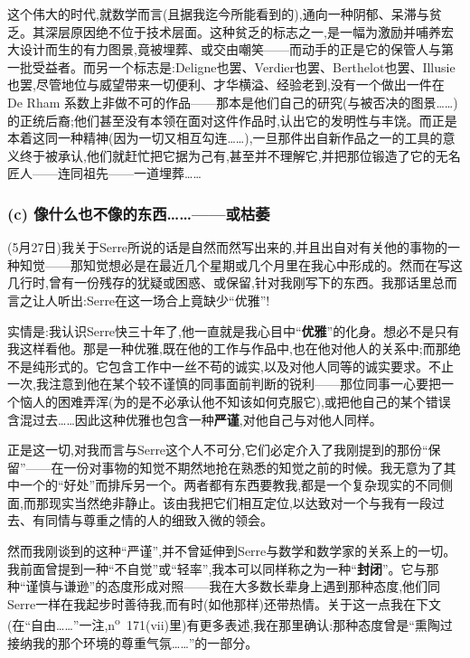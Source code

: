 这个伟大的时代,就数学而言(且据我迄今所能看到的),通向一种阴郁、呆滞与贫乏。其深层原因绝不位于技术层面。这种贫乏的标志之一,是一幅为激励并哺养宏大设计而生的有力图景,竟被埋葬、或交由嘲笑——而动手的正是它的保管人与第一批受益者。而另一个标志是:Deligne也罢、Verdier也罢、Berthelot也罢、Illusie也罢,尽管地位与威望带来一切便利、才华横溢、经验老到,没有一个做出一件在 De Rham 系数上非做不可的作品——那本是他们自己的研究(与被否决的图景……)的正统后裔;他们甚至没有本领在面对这件作品时,认出它的发明性与丰饶。而正是本着这同一种精神(因为一切又相互勾连……),一旦那件出自新作品之一的工具的意义终于被承认,他们就赶忙把它据为己有,甚至并不理解它,并把那位锻造了它的无名匠人——连同祖先——一道埋葬……
\subsubsection*{(c) 像什么也不像的东西……——或枯萎}



(5月27日)我关于Serre所说的话是自然而然写出来的,并且出自对有关他的事物的一种知觉——那知觉想必是在最近几个星期或几个月里在我心中形成的。\dmark{}然而在写这几行时,曾有一份残存的犹疑或困惑、或保留,针对我刚写下的东西。我那话里总而言之让人听出:Serre在这一场合上竟缺少“优雅”!

实情是:我认识Serre快三十年了,他一直就是我心目中“\textbf{优雅}”的化身。想必不是只有我这样看他。那是一种优雅,既在他的工作与作品中,也在他对他人的关系中;而那绝不是纯形式的。它包含工作中一丝不苟的诚实,以及对他人同等的诚实要求。不止一次,我注意到他在某个较不谨慎的同事面前判断的锐利——那位同事一心要把一个恼人的困难弄浑(为的是不必承认他不知该如何克服它),或把他自己的某个错误含混过去……因此这种优雅也包含一种\textbf{严谨},对他自己与对他人同样。

正是这一切,对我而言与Serre这个人不可分,它们必定介入了我刚提到的那份“保留”——在一份对事物的知觉不期然地抢在熟悉的知觉之前的时候。我无意为了其中一个的“好处”而排斥另一个。两者都有东西要教我,都是一个复杂现实的不同侧面,而那现实当然绝非静止。该由我把它们相互定位,以达致对一个与我有一段过去、有同情与尊重之情的人的细致入微的领会。

然而我刚谈到的这种“严谨”,并不曾延伸到Serre与数学和数学家的关系上的一切。我前面曾提到一种“不自觉”或“轻率”,我本可以同样称之为一种“\textbf{封闭}”。它与那种“谨慎与谦逊”的态度形成对照——我在大多数长辈身上遇到那种态度,他们同Serre一样在我起步时善待我,而有时(如他那样)还带热情。关于这一点我在下文(在“自由……”一注,n\textsuperscript{o}~171(vii)里)有更多表述,我在那里确认:那种态度曾是“熏陶过接纳我的那个环境的尊重气氛……”的一部分。

